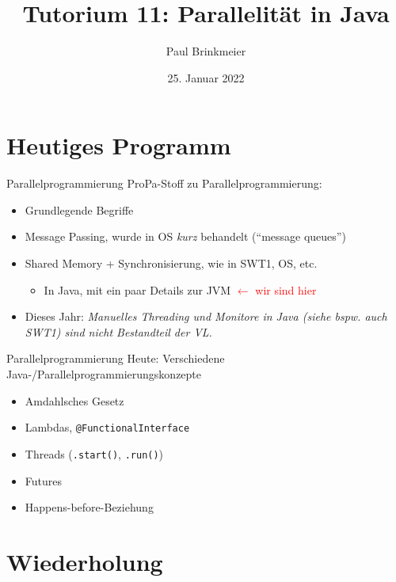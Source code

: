 \documentclass{beamer}
\title{Tutorium 11: Parallelität in Java}
\author{Paul Brinkmeier}
\institute{Tutorium Programmierparadigmen am KIT}
\date{25. Januar 2022}
\begin{document}
\begin{frame}
	\titlepage
\end{frame}

\section{Heutiges Programm}

\begin{frame}{Parallelprogrammierung}
	ProPa-Stoff zu Parallelprogrammierung:

	\begin{itemize}
		\item Grundlegende Begriffe
		\item Message Passing, wurde in OS \emph{kurz} behandelt (\enquote{message queues})
		\item Shared Memory + Synchronisierung, wie in SWT1, OS, etc.
		\begin{itemize}
                  \item In Java, mit ein paar Details zur JVM \textcolor{red}{$\leftarrow$ wir sind hier}
		\end{itemize}
              \item Dieses Jahr: \emph{Manuelles Threading und Monitore in Java (siehe bspw. auch SWT1) sind nicht Bestandteil der VL.}
	\end{itemize}
\end{frame}

\begin{frame}{Parallelprogrammierung}
  Heute: Verschiedene Java-/Parallelprogrammierungskonzepte

  \begin{itemize}
    \item Amdahlsches Gesetz
    \item Lambdas, \texttt{@FunctionalInterface}
    \item Threads (\texttt{.start()}, \texttt{.run()})
    \item Futures
    \item Happens-before-Beziehung
  \end{itemize}
\end{frame}

\section{Wiederholung}
\end{document}
